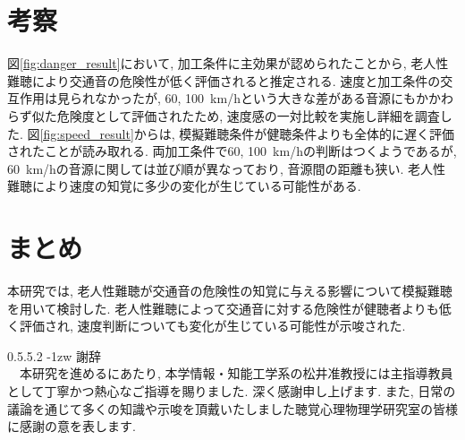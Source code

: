 \documentclass[10pt,twocolumn,uplatex,dvipdfmx]{jsarticle} %
\makeatletter
\renewcommand{\paragraph}{\@startsection{paragraph}{2}{\z@}%
    {\z@}{-1zw}%
    {\normalfont\normalsize\headfont}}
\renewcommand{\paragraph}{\@startsection{paragraph}{2}{\z@}%
    {0.5\Cvs \@plus.5\Cdp \@minus.2\Cdp}%
    {-1zw}%
    {\normalfont\normalsize\headfont}}
\makeatother
\begin{document}
\vspace{-8truemm}


\section{考察}

図\ref{fig:danger_result}において, 加工条件に主効果が認められたことから, 老人性難聴により交通音の危険性が低く評価されると推定される.
速度と加工条件の交互作用は見られなかったが, 60, 100~km/hという大きな差がある音源にもかかわらず似た危険度として評価されたため, 速度感の一対比較を実施し詳細を調査した.
図\ref{fig:speed_result}からは, 模擬難聴条件が健聴条件よりも全体的に遅く評価されたことが読み取れる. 両加工条件で60, 100~km/hの判断はつくようであるが,  60~km/hの音源に関しては並び順が異なっており, 音源間の距離も狭い. 老人性難聴により速度の知覚に多少の変化が生じている可能性がある.



\section{まとめ}

本研究では, 老人性難聴が交通音の危険性の知覚に与える影響について模擬難聴を用いて検討した. 老人性難聴によって交通音に対する危険性が健聴者よりも低く評価され, 速度判断についても変化が生じている可能性が示唆された.

\paragraph{謝辞}
 　\\ 　本研究を進めるにあたり, 本学情報・知能工学系の松井准教授には主指導教員として丁寧かつ熱心なご指導を賜りました. 深く感謝申し上げます. また, 日常の議論を通じて多くの知識や示唆を頂戴いたしました聴覚心理物理学研究室の皆様に感謝の意を表します.
\end{document}
